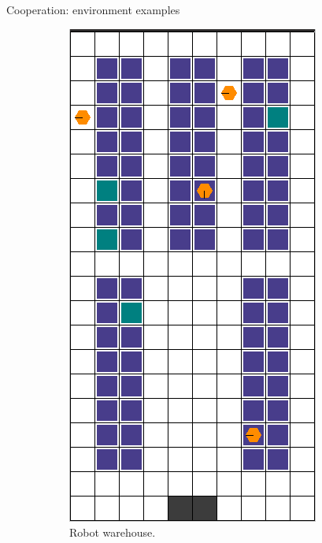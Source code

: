 \documentclass[9pt, hyperref={pdfusetitle,colorlinks=true,allcolors=DarkBlue}]{beamer}
\begin{document}
\begin{frame}{Cooperation: environment examples}
\begin{figure}

\begin{subfigure}[b]{0.33\textwidth}
    \centering
    \includegraphics[width=.95\textwidth]{rware-small-4ag.png}
    \caption{Robot warehouse.}
\end{subfigure}%
\begin{subfigure}[b]{0.66\textwidth}
        \centering
        

\end{subfigure}
\end{figure}
\end{frame}
\end{document}

